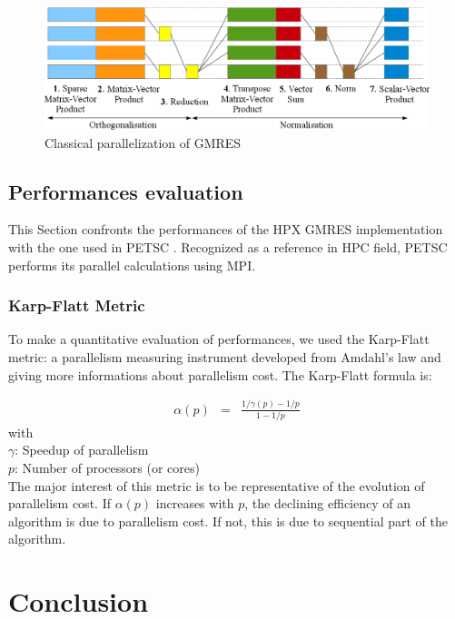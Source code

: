\documentclass{llncs}
\begin{document}
\begin{figure}[h]
\begin{center}
\includegraphics[scale=0.33]{Images/Im6.png}
\end{center}
\caption{Classical parallelization of GMRES}
\label{pargmres}
\end{figure}

\subsection{Performances evaluation}
This Section confronts the performances of the HPX GMRES implementation with the one used in PETSC \cite{Petsc}. Recognized as a reference in HPC field, PETSC performs its parallel calculations using MPI.

\subsubsection{Karp-Flatt Metric}
To make a quantitative evaluation of performances, we used the Karp-Flatt metric: a parallelism measuring instrument developed from Amdahl's law and giving more informations about parallelism cost. The Karp-Flatt formula is:

\begin{eqnarray}
\alpha(p) &=&\frac{1/\gamma(p) - 1/p}{1-1/p} \label{KarpFlatt}
\end{eqnarray}
with\\
$\gamma$: Speedup of parallelism\\
$p$: Number of processors (or cores)\\

The major interest of this metric is to be representative of the evolution of parallelism cost. If $\alpha(p)$ increases with $p$, the declining efficiency of an algorithm is due to parallelism cost. If not, this is due to sequential part of the algorithm.

\section{Conclusion}



\end{document}
